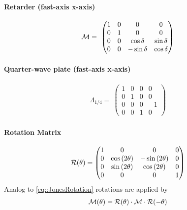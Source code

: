 \paragraph{Retarder (fast-axis x-axis)}
\begin{align}
\mathcal{M}=\
\begin{pmatrix}
    1 & 0 & 0 &  0 \\
    0 & 1 & 0 &  0 \\
    0 & 0 & \cos \delta & \sin \delta \\
    0 & 0 & -\sin \delta &  \cos \delta
\end{pmatrix}
\end{align}
%
\paragraph{Quarter-wave plate (fast-axis x-axis)}
\begin{align}
\Lambda_{1/4}=\
\begin{pmatrix}
    1 & 0 & 0 &  0 \\
    0 & 1 & 0 &  0 \\
    0 & 0 & 0 & -1 \\
    0 & 0 & 1 &  0
\end{pmatrix}
\end{align}
%
\paragraph{Rotation Matrix}
\begin{align}
\mathcal{R}(\theta)=
\begin{split}
\begin{pmatrix}
    1 &                0 &               0 & 0 \\
    0 & \cos{(2\theta)} & -\sin{(2\theta)} & 0 \\
    0 & \sin{(2\theta)} & \cos{(2\theta)} & 0 \\
    0 &                0 &               0 & 1
  \end{pmatrix}
\end{split}
\end{align}
%
Analog to \cref{eq::JonesRotation} rotations are applied by
\begin{align}
\mathcal{M}(\theta )=\mathcal{R}(\theta )\cdot\mathcal{M}\cdot\mathcal{R}(-\theta )
\end{align}
%
%
% 
%
